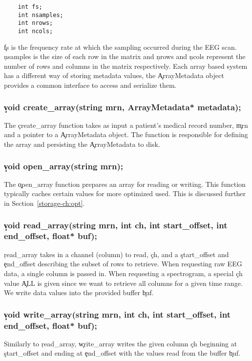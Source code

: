 \begin{lstlisting}
    int fs;
    int nsamples;
    int nrows;
    int ncols;
\end{lstlisting}

\c{fs} is the frequency rate at which the sampling occurred during the EEG
scan. \c{nsamples} is the size of each row in the matrix and \c{nrows} and
\c{ncols} represent the number of rows and columns in the matrix respectively.
Each array based system has a different way of storing metadata values, the
\c{ArrayMetadata} object provides a common interface to access and serialize them.

\subsubsection{\c{void create\_array(string mrn, ArrayMetadata* metadata);}}
The \c{create\_array} function takes as input a patient's medical record
number, \c{mrn} and a pointer to a \c{ArrayMetadata} object. The function is
responsible for defining the array and persisting the \c{ArrayMetadata} to
disk.

\subsubsection{\c{void open\_array(string mrn);}}
The \c{open\_array} function prepares an array for reading or writing. This
function typically caches certain values for more optimized used. This is
discussed further in Section~\ref{storage-ch:opt}.

\subsubsection{\c{void read\_array(string mrn, int ch, int start\_offset, int end\_offset, float* buf);}}
\c{read\_array} takes in a channel (column) to read, \c{ch}, and a
\c{start\_offset} and \c{end\_offset} describing the subset of rows to
retrieve. When requesting raw EEG data, a single column is passed in. When
requesting a spectrogram, a special \c{ch} value \c{ALL} is given since we want
to retrieve all columns for a given time range. We write data values into
the provided buffer \c{buf}.

\subsubsection{\c{void write\_array(string mrn, int ch, int start\_offset, int end\_offset, float* buf);}}
Similarly to \c{read\_array}, \c{write\_array} writes the given column \c{ch}
beginning at \c{start\_offset} and ending at \c{end\_offset} with the values
read from the buffer \c{buf}.

